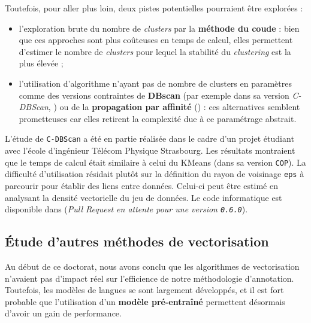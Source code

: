 		Toutefois, pour aller plus loin, deux pistes potentielles pourraient être explorées :
		\begin{itemize}
			\item l'exploration brute du nombre de \textit{clusters} par la \textbf{méthode du coude} : bien que ces approches sont plus coûteuses en temps de calcul, elles permettent d'estimer le nombre de \textit{clusters} pour lequel la stabilité du \textit{clustering} est la plus élevée ;
			\item l'utilisation d'algorithme n'ayant pas de nombre de clusters en paramètres comme des versions contraintes de \textbf{DBscan} (par exemple dans sa version \textit{C-DBScan}, \cite{ruiz-etal:2010:densitybased-semisupervised-clustering}) ou de la \textbf{propagation par affinité} (\cite{givoni-frey:2009:semisupervised-affinity-propagation}) : ces alternatives semblent prometteuses car elles retirent la complexité due à ce paramétrage abstrait.
		\end{itemize}
		
		\begin{leftBarInformation}
			L'étude de \texttt{C-DBScan} a été en partie réalisée dans le cadre d'un projet étudiant avec l'école d'ingénieur Télécom Physique Strasbourg.
			Les résultats montraient que le temps de calcul était similaire à celui du KMeans (dans sa version \texttt{COP}).
			La difficulté d'utilisation résidait plutôt sur la définition du rayon de voisinage \texttt{eps} à parcourir pour établir des liens entre données.
			Celui-ci peut être estimé en analysant la densité vectorielle du jeu de données.
			Le code informatique est disponible dans \cite{schild:2022:cognitivefactory-interactiveclustering} (\textit{\textit{Pull Request} en attente pour une version \texttt{0.6.0}}).
		\end{leftBarInformation}
	
	
	\subsection{Étude d'autres méthodes de vectorisation}
	\label{section:4.7.2-HYPOTHESES-NON-VERIFIEES-VECTORISATION}
	
		Au début de ce doctorat, nous avons conclu que les algorithmes de vectorisation n'avaient pas d'impact réel sur l'efficience de notre méthodologie d'annotation.
		Toutefois, les modèles de langues se sont largement développés, et il est fort probable que l'utilisation d'un \textbf{modèle pré-entraîné} permettent désormais d'avoir un gain de performance.
		
